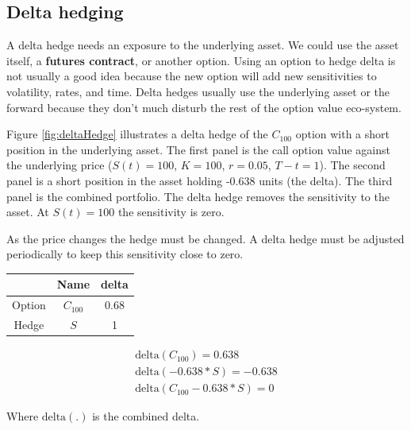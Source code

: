 \subsection{Delta hedging}

A delta hedge needs an exposure to the underlying asset. We could use the asset itself, a \textbf{futures contract}, or another option. Using an option to hedge delta is not usually a good idea because the new option will add new sensitivities to volatility, rates, and time. Delta hedges usually use the underlying asset or the forward because they don't much disturb the rest of the option value eco-system. 

Figure \ref{fig:deltaHedge} illustrates a delta hedge of the $C_{100}$ option with a short position in the underlying asset. The first panel is the call option value against the underlying price ($S(t) = 100$, $K = 100$, $r = 0.05$, $T-t=1$).  The second panel is a short position in the asset holding -0.638 units (the delta). The third panel is the combined portfolio. The delta hedge removes the sensitivity to the asset. At $S(t)=100$ the sensitivity is zero. 

As the price changes the hedge must be changed. A delta hedge must be adjusted periodically to keep this sensitivity close to zero.


\begin{center}
\begin{tabular}{|c|cc|}
\hline
 & Name & delta\\
\hline
Option & $C_{100}$ & 0.68\\
Hedge & $S$ & 1\\
\hline
\end{tabular}
\end{center}

\begin{eqnarray*}
\mbox{delta}(C_{100}) = 0.638\\
\mbox{delta}(-0.638*S) = -0.638\\
\mbox{delta}(C_{100} -0.638*S) = 0
\end{eqnarray*}

Where $\mbox{delta}(.)$ is the combined delta.

